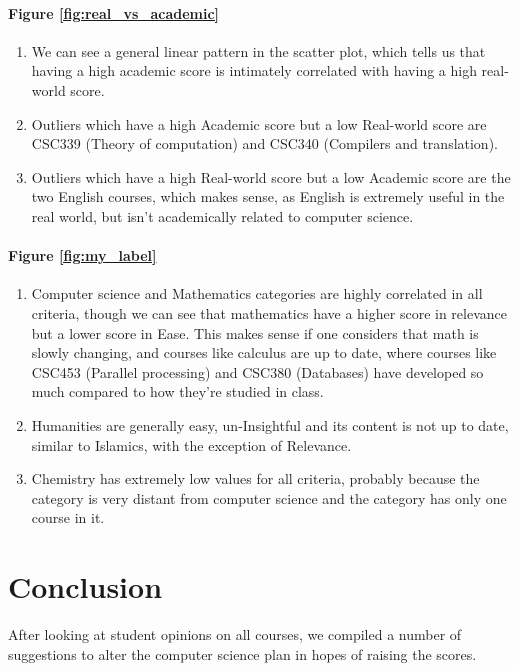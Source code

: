 \documentclass[12pt,a4paper]{article}
\begin{document}
\paragraph{Figure \ref{fig:real_vs_academic}}
\begin{enumerate}
    \item We can see a general linear pattern in the scatter plot, which tells us that having a high academic score is intimately correlated with having a high real-world score.
    \item Outliers which have a high Academic score but a low Real-world score are CSC339 (Theory of computation) and CSC340 (Compilers and translation).
    \item Outliers which have a high Real-world score but a low Academic score are the two English courses, which makes sense, as English is extremely useful in the real world, but isn't academically related to computer science.
\end{enumerate}

\paragraph{Figure \ref{fig:my_label}}
\begin{enumerate}
    \item Computer science and Mathematics categories are highly correlated in all criteria, though we can see that mathematics have a higher score in relevance but a lower score in Ease. This makes sense if one considers that math is slowly changing, and courses like calculus are up to date, where courses like CSC453 (Parallel processing) and CSC380 (Databases) have developed so much compared to how they're studied in class.
    \item Humanities are generally easy, un-Insightful and its content is not up to date, similar to Islamics, with the exception of Relevance.
    \item Chemistry has extremely low values for all criteria, probably because the category is very distant from computer science and the category has only one course in it.
\end{enumerate}

\section{Conclusion}
After looking at student opinions on all courses, we compiled a number of suggestions to alter the computer science plan in hopes of raising the scores.
\end{document}
